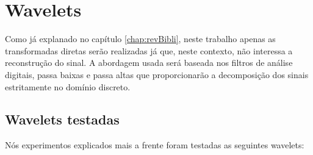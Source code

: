 	\section{Wavelets}
		\par Como já explanado no capítulo \ref{chap:revBibli}, neste trabalho apenas as transformadas diretas serão realizadas já que, neste contexto, não interessa a reconstrução do sinal. A abordagem usada será baseada nos filtros de análise digitais, passa baixas e passa altas que proporcionarão a decomposição dos sinais estritamente no domínio discreto.

		\subsection{Wavelets testadas}
			\par Nós experimentos explicados mais a  frente foram testadas as seguintes wavelets:
